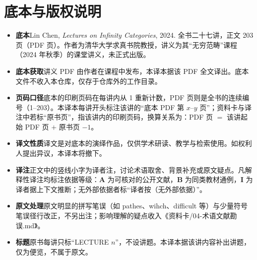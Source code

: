 \thispagestyle{plain}
\section*{底本与版权说明}

\begin{itemize}[leftmargin=0em,itemsep=0.45em,label={}]
\item \textbf{底本}\quad Lin Chen, \emph{Lectures on Infinity Categories}, 2024. 全书二十七讲，正文 203 页（PDF 页）。作者为清华大学求真书院教授，讲义为其“无穷范畴”课程（2024 年秋季）的课堂讲义，未正式出版。
\item \textbf{底本获取}\quad 讲义 PDF 由作者在课程中发布，本译本据该 PDF 全文译出。底本文件不收入本仓库，仅存于仓库外的工作目录。
\item \textbf{页码口径}\quad 底本的印刷页码在每讲内从 1 重新计数，PDF 页则是全书的连续编号（1–203）。本译本每讲开头标注该讲的“底本 PDF 第 $x$–$y$ 页”；资料卡与译注中若标“原书页”，指该讲内的印刷页码，换算关系为：PDF 页 $=$ 该讲起始 PDF 页 $+$ 原书页 $-1$。
\item \textbf{译文性质}\quad 译文是对底本的演绎作品，仅供学术研读、教学与检索使用。如权利人提出异议，本译本将撤下。
\item \textbf{译注}\quad 正文中的竖线小字为译者注，讨论术语取舍、背景补充或原文疑点。凡解释性译注均标注依据等级：\textbf{A} 为可核对的公开文献，\textbf{B} 为同类教材通例，\textbf{I} 为译者据上下文推断；无外部依据者标“译者按（无外部依据）”。
\item \textbf{原文处理}\quad 原文明显的拼写笔误（如 pathes、wihch、diﬃcult 等）与少量符号笔误径行改正，不另出注；影响理解的疑点收入《资料卡/04-术语文献勘误.md》。
\item \textbf{标题}\quad 原书每讲只标“LECTURE $n$”，不设讲题。本译本据该讲内容补出讲题，仅为便览，不属于原文。
\end{itemize}
